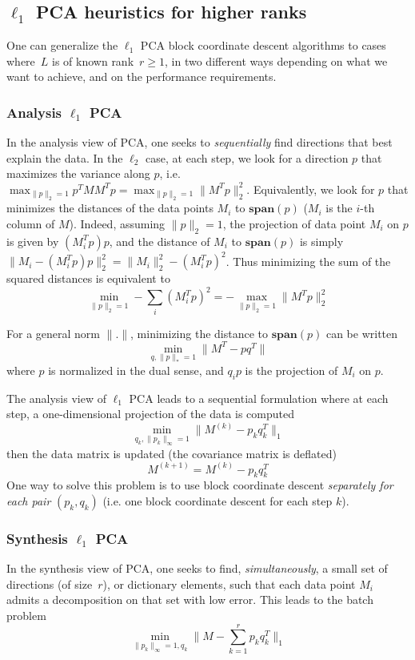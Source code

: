 \newpage
\subsection{$\ell_{1}$ PCA heuristics for higher ranks}
One can generalize the $\ell_1$ PCA block coordinate descent algorithms to cases where~$L$ is of known rank~$r \geq 1$, in two different ways depending on what we want to achieve, and on the performance requirements.

\subsubsection{Analysis $\ell_1$ PCA}
In the analysis view of PCA, one seeks to \emph{sequentially} find directions that best explain the data. In the $\ell_2$ case, at each step, we look for a direction $p$ that maximizes the variance along $p$, i.e. $\max_{\|p\|_2 =1} p^TMM^Tp = \max_{\|p\|_2 =1} \|M^Tp\|_2^2$. Equivalently, we look for $p$ that minimizes the distances of the data points $M_i$ to $\mathbf{span}(p)$ ($M_i$ is the $i$-th column of $M$). Indeed, assuming $\|p\|_2 =1$, the projection of data point $M_i$ on $p$ is given by $(M_i^Tp) p$, and the distance of $M_i$ to $\mathbf{span}(p)$ is simply $\|M_i - (M_i^Tp) p\|_2^2 = \|M_i\|_2^2 - (M_i^Tp)^2$. Thus minimizing the sum of the squared distances is equivalent to
\[
\min_{\|p\|_2 = 1} - \sum_i (M_i^Tp)^2 = - \max_{\|p\|_2 = 1} \|M^Tp\|_2^2
\]

For a general norm $\|.\|$, minimizing the distance to $\mathbf{span}(p)$ can be written
\[
\min_{q, \|p\|_* = 1} \|M^T - p q^T\|
\]
where $p$ is normalized in the dual sense, and $q_i p$ is the projection of $M_i$ on $p$.

The analysis view of $\ell_1$ PCA leads to a sequential formulation where at each step, a one-dimensional projection of the data is computed
\[
\min_{q_k, \|p_k\|_\infty = 1} \|M^{(k)} - p_kq_k^T\|_1
\]
then the data matrix is updated (the covariance matrix is deflated)
\[
M^{(k+1)} = M^{(k)} - p_kq_k^T
\]
One way to solve this problem is to use block coordinate descent \emph{separately for each pair} $(p_k, q_k)$ (i.e. one block coordinate descent for each step $k$).

\subsubsection{Synthesis $\ell_1$ PCA}
In the synthesis view of PCA, one seeks to find, \emph{simultaneously}, a small set of directions (of size~$r$), or dictionary elements, such that each data point $M_i$ admits a decomposition on that set with low error. This leads to the batch problem
\[
\min_{\|p_k\|_\infty = 1, q_k} \| M - \sum_{k=1}^{r} p_k q_k^T \|_1
\]

